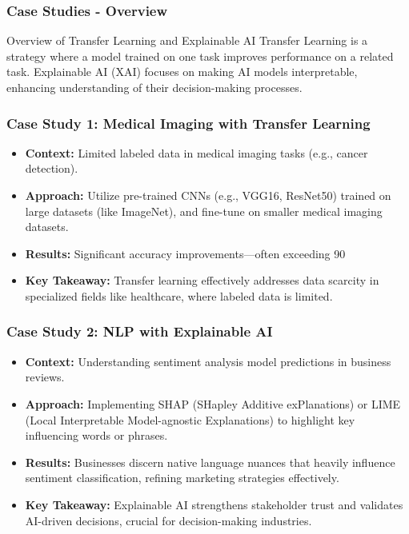 \documentclass[aspectratio=169]{beamer}
\begin{document}
\begin{frame}[fragile]
    \frametitle{Case Studies - Overview}
    \begin{block}{Overview of Transfer Learning and Explainable AI}
        Transfer Learning is a strategy where a model trained on one task improves performance on a related task. 
        Explainable AI (XAI) focuses on making AI models interpretable, enhancing understanding of their decision-making processes.
    \end{block}
\end{frame}

\begin{frame}[fragile]
    \frametitle{Case Study 1: Medical Imaging with Transfer Learning}
    \begin{itemize}
        \item \textbf{Context:} Limited labeled data in medical imaging tasks (e.g., cancer detection).
        
        \item \textbf{Approach:} Utilize pre-trained CNNs (e.g., VGG16, ResNet50) trained on large datasets (like ImageNet), and fine-tune on smaller medical imaging datasets.
        
        \item \textbf{Results:} Significant accuracy improvements—often exceeding 90%
        
        \item \textbf{Key Takeaway:} Transfer learning effectively addresses data scarcity in specialized fields like healthcare, where labeled data is limited.
    \end{itemize}
\end{frame}

\begin{frame}[fragile]
    \frametitle{Case Study 2: NLP with Explainable AI}
    \begin{itemize}
        \item \textbf{Context:} Understanding sentiment analysis model predictions in business reviews.
        
        \item \textbf{Approach:} Implementing SHAP (SHapley Additive exPlanations) or LIME (Local Interpretable Model-agnostic Explanations) to highlight key influencing words or phrases.
        
        \item \textbf{Results:} Businesses discern native language nuances that heavily influence sentiment classification, refining marketing strategies effectively.
        
        \item \textbf{Key Takeaway:} Explainable AI strengthens stakeholder trust and validates AI-driven decisions, crucial for decision-making industries.
    \end{itemize}
\end{frame}
\end{document}
